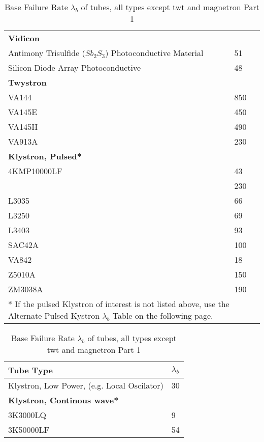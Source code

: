 \begin{table}[ht]
\begin{minipage}[t]{0.465\textwidth}
\begin{tabular}{|p{}|p{}|}
        \textbf{Vidicon} & \\
        \quad Antimony Trisulfide ($Sb_2$$S_3$) Photoconductive Material & 51 \\
        \quad Silicon Diode Array Photoconductive & 48 \\
        \hline
        \textbf{Twystron} & \\
        \quad VA144 & 850 \\
        \quad VA145E & 450 \\
        \quad VA145H & 490 \\
        \quad VA913A & 230 \\
        \hline
        \textbf{Klystron, Pulsed*} & \\
        \quad 4KMP10000LF & 43 \\
        \quad 8568 & 230 \\
        \quad L3035 & 66 \\
        \quad L3250 & 69 \\
        \quad L3403 & 93 \\
        \quad SAC42A & 100 \\
        \quad VA842 & 18 \\
        \quad Z5010A & 150 \\
        \quad ZM3038A & 190 \\
        \hline
        \multicolumn{2}{|p{\textwidth}|}{* If the pulsed Klystron of interest is not listed above, use the Alternate Pulsed Kystron $\lambda_b$ Table on the following page.} \\
        \hline
    \end{tabular}
    \caption{Base Failure Rate $\lambda_b$ of tubes, all types except twt and magnetron Part 1}
    \label{tab:bfr_tubes_all_types_except_twt_and_magnetron1}    
\end{minipage}
\hfill
\begin{minipage}[t]{0.465\textwidth}
    \vspace{0pt}
    \begin{tabular}{|p{}|p{}|}
        \hline
        \textbf{Tube Type} & \textbf{$\lambda_b$}\\
        \hline
        Klystron, Low Power, (e.g. Local Oscilator) & 30 \\
        \hline
        \textbf{Klystron, Continous wave*} & \\
        \quad 3K3000LQ & 9 \\
        \quad 3K50000LF & 54 \\

\end{tabular}
\end{minipage}
\end{table}
